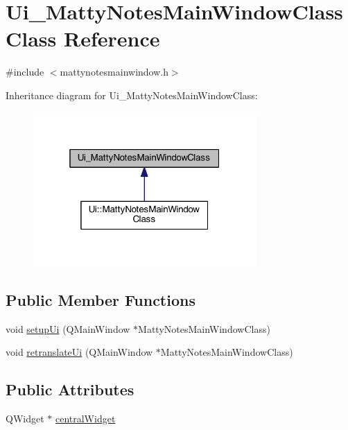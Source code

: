 \hypertarget{classUi__MattyNotesMainWindowClass}{}\section{Ui\+\_\+\+Matty\+Notes\+Main\+Window\+Class Class Reference}
\label{classUi__MattyNotesMainWindowClass}


{\ttfamily \#include $<$mattynotesmainwindow.\+h$>$}



Inheritance diagram for Ui\+\_\+\+Matty\+Notes\+Main\+Window\+Class\+:
\nopagebreak
\begin{figure}[H]
\begin{center}
\leavevmode
\includegraphics[width=241pt]{classUi__MattyNotesMainWindowClass__inherit__graph}
\end{center}
\end{figure}
\subsection*{Public Member Functions}
\begin{DoxyCompactItemize}
\item 
void \hyperlink{classUi__MattyNotesMainWindowClass_abae561e16be81d038b0fb3f8216a3444}{setup\+Ui} (Q\+Main\+Window $\ast$Matty\+Notes\+Main\+Window\+Class)
\item 
void \hyperlink{classUi__MattyNotesMainWindowClass_a306861cb3bb46bfae41abff489d7d785}{retranslate\+Ui} (Q\+Main\+Window $\ast$Matty\+Notes\+Main\+Window\+Class)
\end{DoxyCompactItemize}
\subsection*{Public Attributes}
\begin{DoxyCompactItemize}
\item 
Q\+Widget $\ast$ \hyperlink{classUi__MattyNotesMainWindowClass_aef8d0ae934df8b942afffb11c3d2c5e7}{central\+Widget}
\end{DoxyCompactItemize}


